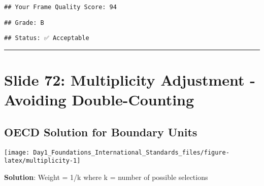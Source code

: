 \documentclass[
]{article}
\newenvironment{Shaded}{\begin{snugshade}}{\end{snugshade}}
\newcommand{\DecValTok}[1]{\textcolor[rgb]{0.00,0.00,0.81}{#1}}
\newcommand{\FunctionTok}[1]{\textcolor[rgb]{0.13,0.29,0.53}{\textbf{#1}}}
\newcommand{\NormalTok}[1]{#1}
\newcommand{\SpecialCharTok}[1]{\textcolor[rgb]{0.81,0.36,0.00}{\textbf{#1}}}
\newcommand{\StringTok}[1]{\textcolor[rgb]{0.31,0.60,0.02}{#1}}
\begin{document}
\begin{verbatim}
## Your Frame Quality Score: 94
\end{verbatim}

\begin{Shaded}
\end{Shaded}

\begin{verbatim}
## Grade: B
\end{verbatim}

\begin{Shaded}
\end{Shaded}

\begin{verbatim}
## Status: ✅ Acceptable
\end{verbatim}

\begin{center}\rule{0.5\linewidth}{0.5pt}\end{center}

\section{Slide 72: Multiplicity Adjustment - Avoiding
Double-Counting}\label{slide-72-multiplicity-adjustment---avoiding-double-counting}

\subsection{OECD Solution for Boundary
Units}\label{oecd-solution-for-boundary-units}

\texttt{[image: Day1\_Foundations\_International\_Standards\_files/figure-latex/multiplicity-1]}

\textbf{Solution}: Weight = 1/k where k = number of possible selections
\end{document}
